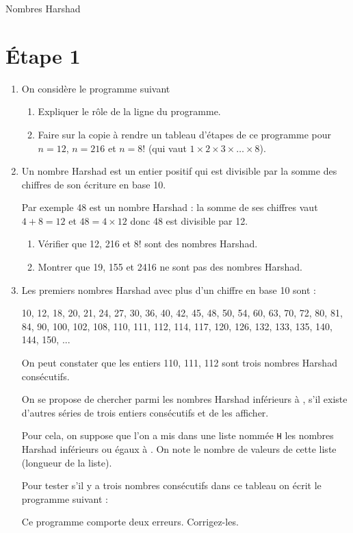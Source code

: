 
\begin{center}
		{\Huge\titlefont\color{UGLiBlue} Nombres Harshad}
\end{center}

\section*{\'Etape 1}


\begin{enumerate}[\bfseries 1.]
 	\item	On considère le programme suivant
			\begin{enumerate}[\bfseries a.]
   				\item 	Expliquer le rôle de la ligne  du programme.
				\item 	Faire sur la copie à rendre un tableau d'étapes de ce programme pour $n=12$, $n=216$ et $n=8!$ (qui vaut $1\times 2\times 3\times \ldots\times 8$).
			\end{enumerate}
	\item  	Un nombre Harshad est un entier positif qui est divisible par la somme des chiffres de son écriture en base 10.\par
			Par exemple 48 est un nombre Harshad : la somme de ses chiffres vaut $4+8=12$ et $48=4\times 12$ donc 48 est divisible par 12.	
			\begin{enumerate}[\bfseries a.]
				\item 			Vérifier que 12, 216 et 8! sont des nombres Harshad.
				\item 			Montrer que 19, 155 et 2416 ne sont pas des nombres Harshad.	
			\end{enumerate}
	\item	Les premiers nombres Harshad avec plus d'un chiffre en base 10 sont :
	
	10, 12, 18, 20, 21, 24, 27, 30, 36, 40, 42, 45, 48, 50, 54, 60, 63, 70, 72, 80, 81, 84, 90, 100, 102, 108, 110, 111, 112, 114, 117, 120, 126, 132, 133, 135, 140, 144, 150, ...
	
	On peut constater que les entiers 110, 111, 112 sont trois nombres Harshad consécutifs.
	
	On se propose de chercher parmi les nombres Harshad inférieurs à , s'il existe d'autres séries de trois entiers consécutifs et de les afficher.
	
	Pour cela, on suppose que l'on a mis dans une liste nommée \texttt{H} les nombres Harshad inférieurs ou égaux à . On note  le nombre de valeurs de cette liste (longueur de la liste).
	
	Pour tester s'il y a trois nombres consécutifs dans ce tableau on écrit le programme suivant :
	
	Ce programme comporte deux erreurs. Corrigez-les.
	\end{enumerate}
